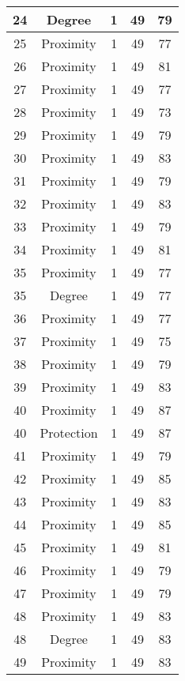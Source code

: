 \documentclass[results.tex]{subfiles}
\begin{document}
\begin{center}
\begin{tabular}{| c || c | c | c | c |}
    \hline
    24 & Degree & 1 & 49 & 79 \\ 
    \hline
    25 & Proximity & 1 & 49 & 77 \\ 
    \hline
    26 & Proximity & 1 & 49 & 81 \\ 
    \hline
    27 & Proximity & 1 & 49 & 77 \\ 
    \hline
    28 & Proximity & 1 & 49 & 73 \\ 
    \hline
    29 & Proximity & 1 & 49 & 79 \\ 
    \hline
    30 & Proximity & 1 & 49 & 83 \\ 
    \hline
    31 & Proximity & 1 & 49 & 79 \\ 
    \hline
    32 & Proximity & 1 & 49 & 83 \\ 
    \hline
    33 & Proximity & 1 & 49 & 79 \\ 
    \hline
    34 & Proximity & 1 & 49 & 81 \\ 
    \hline
    35 & Proximity & 1 & 49 & 77 \\ 
    \hline
    35 & Degree & 1 & 49 & 77 \\ 
    \hline
    36 & Proximity & 1 & 49 & 77 \\ 
    \hline
    37 & Proximity & 1 & 49 & 75 \\ 
    \hline
    38 & Proximity & 1 & 49 & 79 \\ 
    \hline
    39 & Proximity & 1 & 49 & 83 \\ 
    \hline
    40 & Proximity & 1 & 49 & 87 \\ 
    \hline
    40 & Protection & 1 & 49 & 87 \\ 
    \hline
    41 & Proximity & 1 & 49 & 79 \\ 
    \hline
    42 & Proximity & 1 & 49 & 85 \\ 
    \hline
    43 & Proximity & 1 & 49 & 83 \\ 
    \hline
    44 & Proximity & 1 & 49 & 85 \\ 
    \hline
    45 & Proximity & 1 & 49 & 81 \\ 
    \hline
    46 & Proximity & 1 & 49 & 79 \\ 
    \hline
    47 & Proximity & 1 & 49 & 79 \\ 
    \hline
    48 & Proximity & 1 & 49 & 83 \\ 
    \hline
    48 & Degree & 1 & 49 & 83 \\ 
    \hline
    49 & Proximity & 1 & 49 & 83 \\ 
    \hline   \end{tabular}
\end{center}
\end{document}
